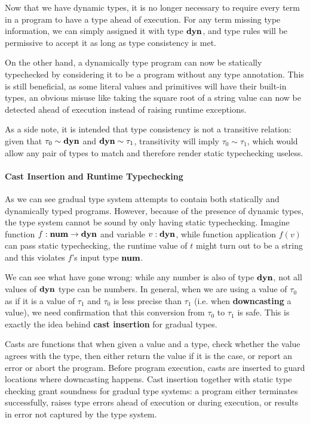 Now that we have dynamic types, it is no longer necessary to require
every term in a program to have a type ahead of execution.
For any term missing type information, we can simply assigned it with type $\textbf{dyn}$,
and type rules will be permissive to accept it as long as type consistency is met.

On the other hand, a dynamically type program can now be statically typechecked
by considering it to be a program without any type annotation.
This is still beneficial, as some literal values and primitives will have their built-in types,
an obvious misuse like taking the square root of a string value can now be detected ahead of execution
instead of raising runtime exceptions.

As a side note, it is intended that type consistency is not a transitive relation: given that $\tau_0 \sim \textbf{dyn}$ and $\textbf{dyn} \sim \tau_1$, transitivity will imply $\tau_0 \sim \tau_1$, which would
allow any pair of types to match and therefore render static typechecking useless.

\paragraph{Cast Insertion and Runtime Typechecking}

As we can see gradual type system attempts to contain both statically and dynamically typed programs.
However, because of the presence of dynamic types,
the type system cannot be sound by only having static typechecking.
Imagine function $f : \textbf{num} \rightarrow \textbf{dyn}$ and variable $v : \textbf{dyn}$, while function application
$f(v)$ can pass static typechecking, the runtime value of $t$ might turn out to be a string
and this violates $f$'s input type $\textbf{num}$.

We can see what have gone wrong: while any number is also of type $\textbf{dyn}$,
not all values of $\textbf{dyn}$ type can be numbers.
In general, when we are using a value of $\tau_0$ as if it is a value of $\tau_1$ and
$\tau_0$ is less precise than $\tau_1$
(i.e. when \textbf{downcasting} a value), we need confirmation that this conversion
from $\tau_0$ to $\tau_1$ is safe. This is exactly the idea
behind \textbf{cast insertion} for gradual types.

Casts are functions that when given a value and a type, check whether the value
agrees with the type, then either return the value if it is the case, or report an error
or abort the program.
Before program execution, casts are inserted to guard locations where downcasting happens.
Cast insertion together with static type checking grant soundness for gradual type systems:
a program either terminates successfully, raises type errors ahead of execution or during execution, or
results in error not captured by the type system.

